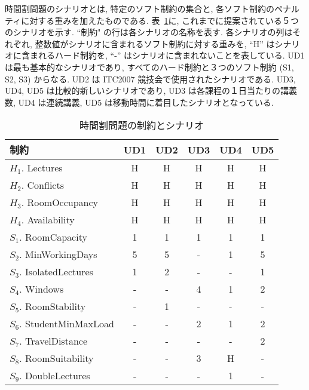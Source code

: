 時間割問題のシナリオとは, 特定のソフト制約の集合と, 各ソフト制約のペナルティに対する重みを加えたものである. 表~\ref{table:const}に, これまでに提案されている５つのシナリオを示す. ``制約" の行は各シナリオの名称を表す. 各シナリオの列はそれぞれ, 整数値がシナリオに含まれるソフト制約に対する重みを, “H” はシナリオに含まれるハード制約を, “-” はシナリオに含まれないことを表している. UD1 は最も基本的なシナリオであり, すべてのハード制約と３つのソフト制約 (S1, S2, S3) からなる. UD2 は ITC2007 競技会で使用されたシナリオである. UD3, UD4, UD5 は比較的新しいシナリオであり, UD3 は各課程の１日当たりの講義数, UD4 は連続講義, UD5 は移動時間に着目したシナリオとなっている.

\begin{table}
  \centering
  \caption{時間割問題の制約とシナリオ}
  \label{table:const}
\begin{tabular}{l|ccccc}\hline
  制約                     			 &  UD1  &  UD2  &  UD3  &  UD4  &  UD5  \\
  \hline
  $H_1$. Lectures       		  &  H    &  H    &  H    &  H    &  H    \\
  $H_2$. Conflicts        		  &  H    &  H    &  H    &  H    &  H    \\
  $H_3$. RoomOccupancy 	  &  H    &  H    &  H    &  H    &  H    \\
  $H_4$. Availability       	 	  &  H    &  H    &  H    &  H    &  H    \\
  \hline
  $S_1$. RoomCapacity     	 &  1    &  1    &  1    &  1    &  1    \\
  $S_2$. MinWorkingDays  	 &  5    &  5    &  -    &  1    &  5    \\
  $S_3$. IsolatedLectures  	 &  1    &  2    &  -    &  -    &  1    \\
  $S_4$. Windows              	 &  -    &  -    &  4    &  1    &  2    \\
  $S_5$. RoomStability      	 &  -    &  1    &  -    &  -    &  -    \\
  $S_6$. StudentMinMaxLoad    &  -    &  -    &  2    &  1    &  2    \\
  $S_7$. TravelDistance 	    	 &  -    &  -    &  -    &  -    &  2    \\
  $S_8$. RoomSuitability   	 &  -    &  -    &  3    &  H    &  -    \\
  $S_9$. DoubleLectures     	 &  -    &  -    &  -    &  1    &  - \\
  \hline
\end{tabular}
\end{table}
  

